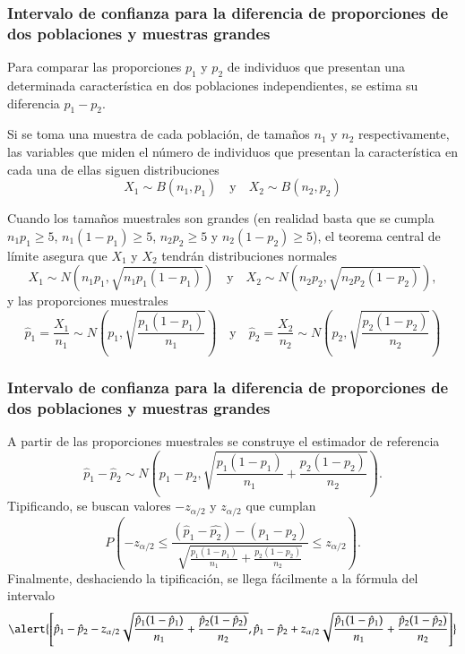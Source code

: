 \begin{frame}
\frametitle{Intervalo de confianza para la diferencia de proporciones de dos poblaciones y muestras grandes}
Para comparar las proporciones $p_1$ y $p_2$ de individuos que presentan una determinada característica en dos poblaciones independientes, se estima su diferencia $p_1-p_2$.

Si se toma una muestra de cada población, de tamaños $n_1$ y $n_2$ respectivamente, las variables que miden el número de individuos que presentan la característica en cada una de ellas siguen distribuciones
\[
X_1\sim B(n_1,p_1)\quad \mbox{y}\quad X_2\sim B(n_2,p_2)
\]

Cuando los tamaños muestrales son grandes (en realidad basta que se cumpla $n_1p_1\geq 5$, $n_1(1-p_1)\geq 5$, $n_2p_2\geq 5$ y $n_2(1-p_2)\geq 5$), el teorema central de límite asegura que $X_1$ y $X_2$ tendrán distribuciones normales
\[
X_1\sim N(n_1p_1,\sqrt{n_1p_1(1-p_1)}) \quad \mbox{y}\quad X_2\sim N(n_2p_2,\sqrt{n_2p_2(1-p_2)}), 
\]
y las proporciones muestrales 
\[
\hat{p}_1=\frac{X_1}{n_1} \sim N\left(p_1,\sqrt{\frac{p_1(1-p_1)}{n_1}}\right) \quad \mbox{y}\quad 
\hat{p}_2=\frac{X_2}{n_2} \sim N\left(p_2,\sqrt{\frac{p_2(1-p_2)}{n_2}}\right)
\]
\end{frame}


\begin{frame}
\frametitle{Intervalo de confianza para la diferencia de proporciones de dos poblaciones y muestras grandes}
A partir de las proporciones muestrales se construye el estimador de referencia 
\[
\hat{p}_1-\hat{p}_2\sim  N\left(p_1-p_2,\sqrt{\frac{p_1(1-p_1)}{n_1}+\frac{p_2(1-p_2)}{n_2}}\right).
\]
Tipificando, se buscan valores $-z_{\alpha/2}$ y $z_{\alpha/2}$ que cumplan
\[
P\left(-z_{\alpha/2}\leq \frac{(\hat{p}_1-\hat{p_2})-(p_1-p_2)}{\sqrt{\frac{p_1(1-p_1)}{n_1}+\frac{p_2(1-p_2)}{n_2}}}\leq z_{\alpha/2} \right).
\]
Finalmente, deshaciendo la tipificación, se llega fácilmente a la fórmula del intervalo
\[
\alert{\left[\hat{p}_1-\hat{p}_2-z_{\alpha/2}\sqrt{\frac{\hat{p}_1(1-\hat{p}_1)}{n_1}+\frac{\hat{p}_2(1-\hat{p}_2)}{n_2}},\hat{p}_1-\hat{p}_2+z_{\alpha/2}\sqrt{\frac{\hat{p}_1(1-\hat{p}_1)}{n_1}+\frac{\hat{p}_2(1-\hat{p}_2)}{n_2}}\right]}
\]
\end{frame}


